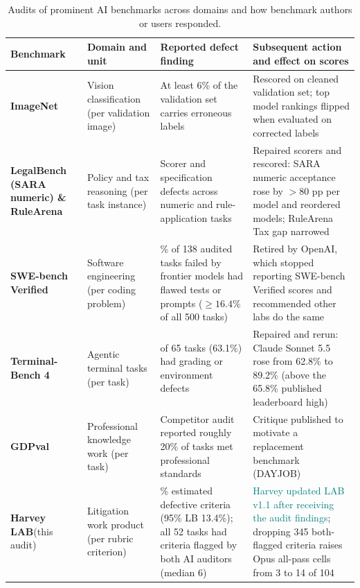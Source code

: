 \documentclass[11pt]{article}
\newcommand{\pending}[1]{\textcolor{teal}{#1}}
\newcommand{\faintrule}{\arrayrulecolor{black!25}\specialrule{0.3pt}{3pt}{3pt}\arrayrulecolor{black}}
\newcommand{\labTasks}{52}
\newcommand{\labDefectivePointShare}{18.7}
\newcommand{\labDefectiveShare}{13.4}
\newcommand{\labNativeCells}{104}
\newcommand{\labNativeOpusAllPass}{3}
\newcommand{\labPopulationBothFlagged}{345}
\newcommand{\labOpusAllPassWithoutBothFlagged}{14}
\begin{document}
\begin{table}[htbp]
\centering\small
\caption{Audits of prominent AI benchmarks across domains and how benchmark authors or users responded.}
\label{tab:cross-domain}
\setlength{\tabcolsep}{4pt}
\renewcommand{\arraystretch}{1.12}
\begin{tabular}{@{}>{\raggedright\arraybackslash}p{.22\linewidth}>{\raggedright\arraybackslash}p{.15\linewidth}>{\raggedright\arraybackslash}p{.31\linewidth}>{\raggedright\arraybackslash}p{.26\linewidth}@{}}
\toprule
Benchmark & Domain and unit & Reported defect finding & Subsequent action and effect on scores \\
\midrule
\textbf{ImageNet}\newline \citep{northcuttLabelErrors} & Vision classification (per validation image) & At least 6\% of the validation set carries erroneous labels & Rescored on cleaned validation set; top model rankings flipped when evaluated on corrected labels \\
\faintrule
\textbf{LegalBench (SARA numeric) \& RuleArena}\newline \citep{xiaoPolicyBench} & Policy and tax reasoning (per task instance) & Scorer and specification defects across numeric and rule-application tasks & Repaired scorers and rescored: SARA numeric acceptance rose by $>80$ pp per model and reordered models; RuleArena Tax gap narrowed \\
\faintrule
\textbf{SWE-bench Verified}\newline \citep{openaiSwebench} & Software engineering (per coding problem) & 59.4\% of 138 audited tasks failed by frontier models had flawed tests or prompts ($\ge 16.4\%$ of all 500 tasks) & Retired by OpenAI, which stopped reporting SWE-bench Verified scores and recommended other labs do the same \\
\faintrule
\textbf{Terminal-Bench 4}\newline \citep{terminalBenchAudit} & Agentic terminal tasks (per task) & 41 of 65 tasks (63.1\%) had grading or environment defects & Repaired and rerun: Claude Sonnet 5.5 rose from 62.8\% to 89.2\% (above the 65.8\% published leaderboard high) \\
\faintrule
\textbf{GDPval}\newline \citep{surgeDayjob} & Professional knowledge work (per task) & Competitor audit reported roughly 20\% of tasks met professional standards & Critique published to motivate a replacement benchmark (DAYJOB) \\
\faintrule
\textbf{Harvey LAB}\newline (this audit) & Litigation work product (per rubric criterion) & \labDefectivePointShare\% estimated defective criteria (95\% LB \labDefectiveShare\%); all \labTasks{} tasks had criteria flagged by both AI auditors (median 6) & \pending{Harvey updated LAB v1.1 after receiving the audit findings}; dropping \labPopulationBothFlagged{} both-flagged criteria raises Opus all-pass cells from \labNativeOpusAllPass{} to \labOpusAllPassWithoutBothFlagged{} of \labNativeCells{} \\

\end{tabular}
\end{table}
\end{document}
